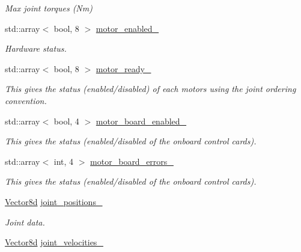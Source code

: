\begin{DoxyCompactItemize}
\begin{DoxyCompactList}\small\item\em Max joint torques (Nm) \end{DoxyCompactList}\item 
std\+::array$<$ bool, 8 $>$ \hyperlink{classblmc__robots_1_1Solo8TI_a3dbd4bd26b5a4273e94ced22d43a9890}{motor\+\_\+enabled\+\_\+}
\begin{DoxyCompactList}\small\item\em Hardware status. \end{DoxyCompactList}\item 
std\+::array$<$ bool, 8 $>$ \hyperlink{classblmc__robots_1_1Solo8TI_a604140f307df2c420c29990948fdbd38}{motor\+\_\+ready\+\_\+}\hypertarget{classblmc__robots_1_1Solo8TI_a604140f307df2c420c29990948fdbd38}{}\label{classblmc__robots_1_1Solo8TI_a604140f307df2c420c29990948fdbd38}

\begin{DoxyCompactList}\small\item\em This gives the status (enabled/disabled) of each motors using the joint ordering convention. \end{DoxyCompactList}\item 
std\+::array$<$ bool, 4 $>$ \hyperlink{classblmc__robots_1_1Solo8TI_a9471bb2684e782adfc1a8db58ba9c18e}{motor\+\_\+board\+\_\+enabled\+\_\+}\hypertarget{classblmc__robots_1_1Solo8TI_a9471bb2684e782adfc1a8db58ba9c18e}{}\label{classblmc__robots_1_1Solo8TI_a9471bb2684e782adfc1a8db58ba9c18e}

\begin{DoxyCompactList}\small\item\em This gives the status (enabled/disabled of the onboard control cards). \end{DoxyCompactList}\item 
std\+::array$<$ int, 4 $>$ \hyperlink{classblmc__robots_1_1Solo8TI_a3621a7c3174f44ba3051577588d55c88}{motor\+\_\+board\+\_\+errors\+\_\+}\hypertarget{classblmc__robots_1_1Solo8TI_a3621a7c3174f44ba3051577588d55c88}{}\label{classblmc__robots_1_1Solo8TI_a3621a7c3174f44ba3051577588d55c88}

\begin{DoxyCompactList}\small\item\em This gives the status (enabled/disabled of the onboard control cards). \end{DoxyCompactList}\item 
\hyperlink{common__header_8hpp_a98975ffbe0bca1296078e0350dfedd60}{Vector8d} \hyperlink{classblmc__robots_1_1Solo8TI_a6ca7d08522f038dc47d6a97f937c6f75}{joint\+\_\+positions\+\_\+}
\begin{DoxyCompactList}\small\item\em Joint data. \end{DoxyCompactList}\item 
\hyperlink{common__header_8hpp_a98975ffbe0bca1296078e0350dfedd60}{Vector8d} \hyperlink{classblmc__robots_1_1Solo8TI_a12037a7a9b29e70df344fcf59b181f01}{joint\+\_\+velocities\+\_\+}\hypertarget{classblmc__robots_1_1Solo8TI_a12037a7a9b29e70df344fcf59b181f01}{}\label{classblmc__robots_1_1Solo8TI_a12037a7a9b29e70df344fcf59b181f01}


\end{DoxyCompactItemize}
